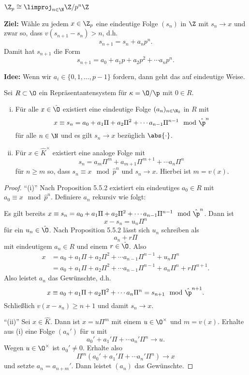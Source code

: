 \begin{Kor}
$\Z_p \cong \limproj_{n\in\N}  \Z/p^n\Z$
\end{Kor}


\textbf{Ziel:} Wähle zu jedem $x\in\Z_p$ eine eindeutige Folge $(s_n)$ in $\Z$ mit $s_n\to x$ und zwar so, dass $v(s_{n+1}-s_n)> n$, d.h.
\[ s_{n+1} = s_n + a_{n} p^n. 
\]
Damit hat $s_{n+1}$ die Form
\[ s_{n+1} = a_0 +a_1p + a_2p^2 + \cdots a_np^n.
\]

\bigskip\textbf{Idee:} Wenn wir $a_i \in \{ 0,1, \dots, p-1 \}$ fordern, dann geht das auf eindeutige Weise.


\begin{Prop}
Sei $R\subset\O$ ein Repräsentantensystem für $\kappa = \O / \p$ mit $0\in R$.
\begin{enumerate}[(i)]
\item Für alle $x\in\hat{\O}$ existiert eine eindeutige Folge $(a_n)_{n\in\N_0}$ in $R$ mit
\[ x \equiv s_{n} = a_0 +a_1\Pi + a_2\Pi^2 + \cdots a_{n-1}\Pi^{n-1} \mod \hat{\p}^n
\]
für alle $n\in\N$ und es gilt $s_n \to x$ bezüglich $\abs{\cdot}$.
\item Für $x\in\hat{K}^\times$ existiert eine analoge Folge mit
\[  s_{n} = a_m\Pi^m +a_{m+1}\Pi^{m+1} +  \cdots a_{n}\Pi^{n} 
\]
für $n\geq m$ so, dass $s_n \equiv x \mod \hat{p}^n$ und $s_n \to x$. Hierbei ist $m=v(x)$.
\end{enumerate}
\end{Prop}

\begin{proof}
\enquote{(i)} Nach Proposition 5.5.2 existiert ein eindeutiges $a_0 \in R$ mit $a_0\equiv x \mod \hat{p}^n$. Definiere $a_n$ rekursiv wie folgt:

Es gilt bereits $x \equiv s_{n} = a_0 +a_1\Pi + a_2\Pi^2 + \cdots a_{n-1}\Pi^{n-1} \mod \hat{\p}^n$. Dann ist
\[ x-s_n = u_n \Pi^n
\]
für ein $u_n \in \hat{\O}$. Nach Proposition 5.5.2 lässt sich $u_n$ schreiben als
\[ a_n + r\Pi
\]
mit eindeutigem $a_n\in R$ und einem $r \in \hat{\O}$. Also
\begin{align*}
x  
&= a_0 +a_1\Pi + a_2\Pi^2 + \cdots a_{n-1}\Pi^{n-1}+ u_n \Pi^n \\
&= a_0 +a_1\Pi + a_2\Pi^2 + \cdots a_{n-1}\Pi^{n-1}  + a_n \Pi^n +r \Pi^{n+1}.
\end{align*}
Also leistet $a_n$ das Gewünschte, d.h.
\[ x \equiv a_0 +a_1\Pi + a_2\Pi^2 + \cdots a_{n}\Pi^{n} = s_{n+1} \mod \hat{\p}^{n+1}.
\]Schließlich $v(x-s_n) \geq n+1$ und damit $s_n \to x$.

\bigskip\enquote{(ii)} Sei $x\in\hat{K}$. Dann ist $x=u\Pi^m$ mit einem $u\in\O^\times$ und $m=v(x)$.
Erhalte aus (i) eine Folge $(a_n')$ für $u$ mit
\[ a_0' + a_1'\Pi + \cdots a_n'\Pi^n \to u.
\]
Wegen $u\in\O^\times$ ist $a_0' \neq 0$. Erhalte also
\[ \Pi^m \left(a_0' + a_1'\Pi + \cdots a_n'\Pi^n  \right) \to x
\]
und setzte $a_n = a_{n+m}'$. Dann leistet $(a_n)$ das Gewünschte.
\end{proof}


